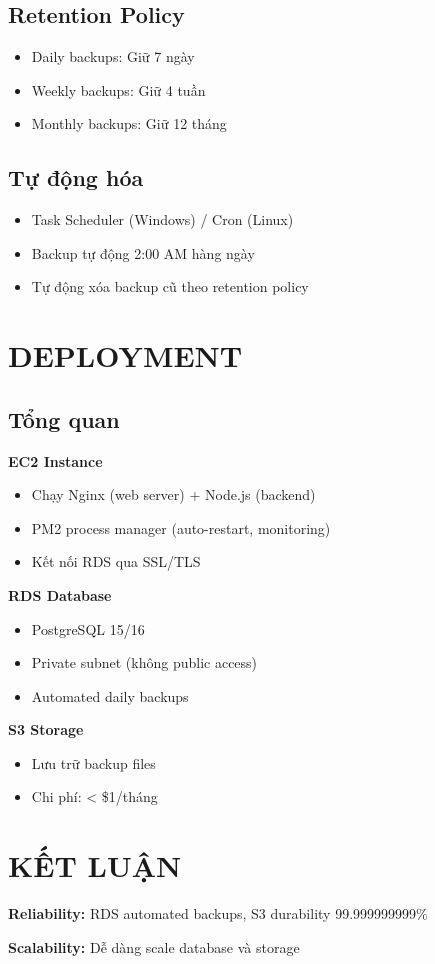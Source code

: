\documentclass[12pt,a4paper]{article}
\begin{document}
\subsection{Retention Policy}

\begin{itemize}
    \item Daily backups: Giữ 7 ngày
    \item Weekly backups: Giữ 4 tuần
    \item Monthly backups: Giữ 12 tháng
\end{itemize}

\subsection{Tự động hóa}

\begin{itemize}
    \item Task Scheduler (Windows) / Cron (Linux)
    \item Backup tự động 2:00 AM hàng ngày
    \item Tự động xóa backup cũ theo retention policy
\end{itemize}

\section{DEPLOYMENT}

\subsection{Tổng quan}

\textbf{EC2 Instance}
\begin{itemize}
    \item Chạy Nginx (web server) + Node.js (backend)
    \item PM2 process manager (auto-restart, monitoring)
    \item Kết nối RDS qua SSL/TLS
\end{itemize}

\textbf{RDS Database}
\begin{itemize}
    \item PostgreSQL 15/16
    \item Private subnet (không public access)
    \item Automated daily backups
\end{itemize}

\textbf{S3 Storage}
\begin{itemize}
    \item Lưu trữ backup files
    \item Chi phí: < \$1/tháng
\end{itemize}

\section{KẾT LUẬN}

\textbf{Reliability:} RDS automated backups, S3 durability 99.999999999\%

\textbf{Scalability:} Dễ dàng scale database và storage
\end{document}
